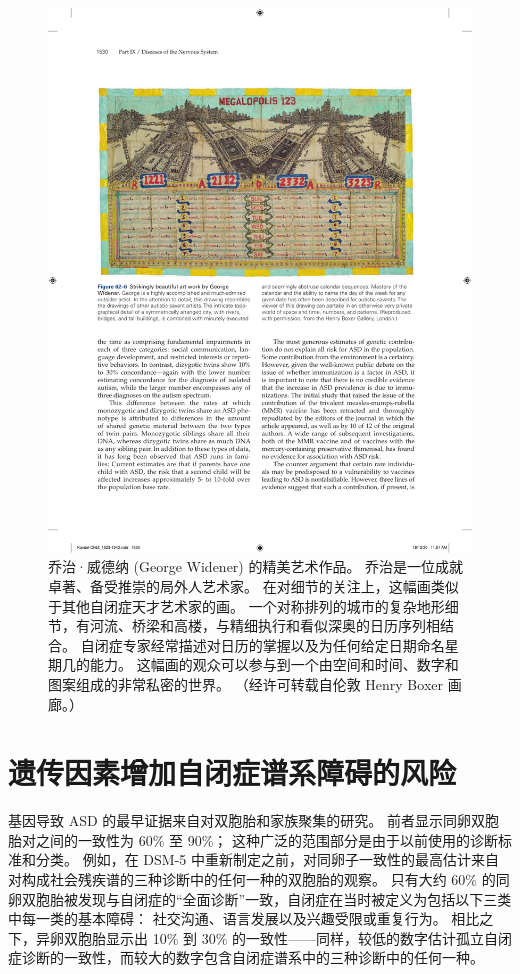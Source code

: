 \begin{figure}[htbp]
	\centering
	\includegraphics[width=0.9\linewidth]{chap62/fig_62_6}
	\caption{乔治·威德纳 (George Widener) 的精美艺术作品。 乔治是一位成就卓著、备受推崇的局外人艺术家。 在对细节的关注上，这幅画类似于其他自闭症天才艺术家的画。 一个对称排列的城市的复杂地形细节，有河流、桥梁和高楼，与精细执行和看似深奥的日历序列相结合。 自闭症专家经常描述对日历的掌握以及为任何给定日期命名星期几的能力。 这幅画的观众可以参与到一个由空间和时间、数字和图案组成的非常私密的世界。 （经许可转载自伦敦 Henry Boxer 画廊。）}
	\label{fig:62_6}
\end{figure}



\section{遗传因素增加自闭症谱系障碍的风险}

基因导致 ASD 的最早证据来自对双胞胎和家族聚集的研究。
前者显示同卵双胞胎对之间的一致性为 60\% 至 90\%；
这种广泛的范围部分是由于以前使用的诊断标准和分类。
例如，在 DSM-5 中重新制定之前，对同卵子一致性的最高估计来自对构成社会残疾谱的三种诊断中的任何一种的双胞胎的观察。
只有大约 60\% 的同卵双胞胎被发现与自闭症的“全面诊断”一致，自闭症在当时被定义为包括以下三类中每一类的基本障碍：
社交沟通、语言发展以及兴趣受限或重复行为。
相比之下，异卵双胞胎显示出 10\% 到 30\% 的一致性——同样，较低的数字估计孤立自闭症诊断的一致性，而较大的数字包含自闭症谱系中的三种诊断中的任何一种。


